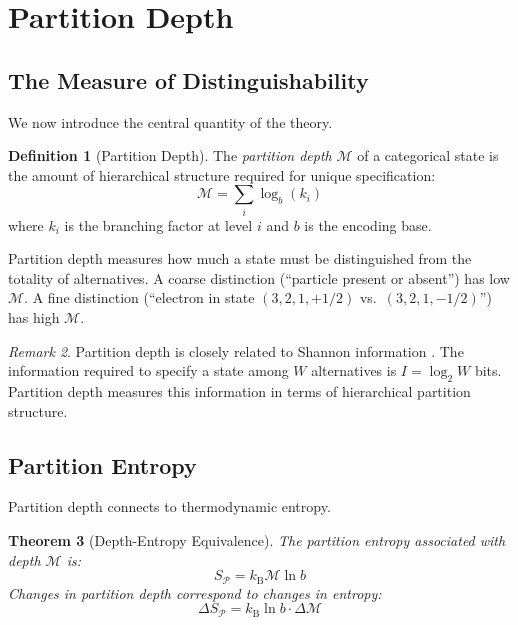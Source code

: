 \documentclass[twocolumn,10pt,a4paper]{article}
\newtheorem{theorem}{Theorem}[section]
\theoremstyle{definition}
\newtheorem{definition}[theorem]{Definition}
\theoremstyle{remark}
\newtheorem{remark}[theorem]{Remark}
\newcommand{\kB}{k_{\mathrm{B}}}
\newcommand{\Depth}{\mathcal{M}}
\newcommand{\Part}{\mathcal{P}}
\begin{document}
\section{Partition Depth}
\label{sec:depth}

\subsection{The Measure of Distinguishability}

We now introduce the central quantity of the theory.

\begin{definition}[Partition Depth]
\label{def:depth}
The \emph{partition depth} $\Depth$ of a categorical state is the amount of hierarchical structure required for unique specification:
\begin{equation}
    \Depth = \sum_{i} \log_b(k_i)
\end{equation}
where $k_i$ is the branching factor at level $i$ and $b$ is the encoding base.
\end{definition}

Partition depth measures how much a state must be distinguished from the totality of alternatives. A coarse distinction (``particle present or absent'') has low $\Depth$. A fine distinction (``electron in state $(3, 2, 1, +1/2)$ vs.\ $(3, 2, 1, -1/2)$'') has high $\Depth$.

\begin{remark}
Partition depth is closely related to Shannon information \citep{shannon1948}. The information required to specify a state among $W$ alternatives is $I = \log_2 W$ bits. Partition depth measures this information in terms of hierarchical partition structure.
\end{remark}

\subsection{Partition Entropy}

Partition depth connects to thermodynamic entropy.

\begin{theorem}[Depth-Entropy Equivalence]
\label{thm:entropy}
The partition entropy associated with depth $\Depth$ is:
\begin{equation}
    S_{\Part} = \kB \Depth \ln b
\end{equation}
Changes in partition depth correspond to changes in entropy:
\begin{equation}
    \Delta S_{\Part} = \kB \ln b \cdot \Delta\Depth
\end{equation}
\end{theorem}
\end{document}
